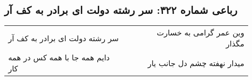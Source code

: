 \begin{center}
\section*{رباعی شماره ۳۲۲: سر رشته دولت ای برادر به کف آر}
\label{sec:sh322}
\begin{longtable}{l p{0.5cm} r}
سر رشته دولت ای برادر به کف آر
&&
وین عمر گرامی به خسارت مگذار
\\
دایم همه جا با همه کس در همه کار
&&
میدار نهفته چشم دل جانب یار
\\
\end{longtable}
\end{center}
